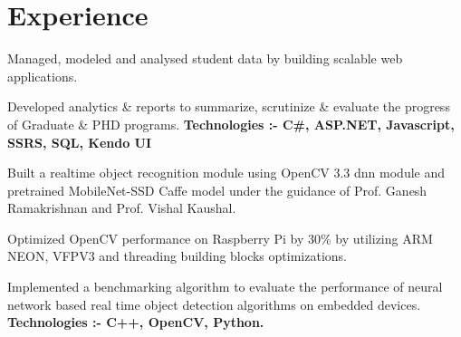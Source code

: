 \documentclass[]{deedy-resume}
\begin{document}
\hfill
\begin{minipage}[t]{0.66\textwidth} 


\section{Experience}
\vspace{\topsep} %
\begin{tightemize}
\item Managed, modeled and analysed student data by building scalable web applications. 
\item Developed analytics \& reports to summarize, scrutinize \& evaluate the progress of Graduate \& PHD programs. {\bf Technologies :- C\#, ASP.NET, Javascript, SSRS, SQL, Kendo UI}
\end{tightemize}
\sectionsep

\begin{tightemize}
\item Built a realtime object recognition module using OpenCV 3.3 dnn module and pretrained MobileNet-SSD Caffe model under the guidance of Prof. Ganesh Ramakrishnan and Prof. Vishal Kaushal.
\item Optimized OpenCV performance on Raspberry Pi by 30\% by utilizing ARM NEON, VFPV3 and threading building blocks optimizations.
\item Implemented a benchmarking algorithm to evaluate the performance of neural network based real time object detection algorithms on embedded devices. {\bf Technologies :- C++, OpenCV, Python.}
\end{tightemize}
\sectionsep


\end{minipage}
\end{document}
